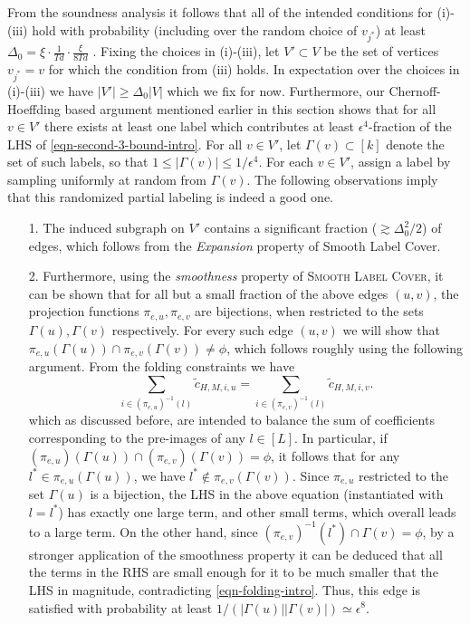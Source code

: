 From the soundness analysis it follows that all of the intended conditions for (i)-(iii) hold with probability (including over the random choice of $v_{j^*}$) at least $\Delta_0 = \xi\cdot\frac{1}{Td}\cdot\frac{\xi}{8Td}$ . Fixing the choices in (i)-(iii), let $V' \subset V$ be the set of vertices $v_{j^*} = v$ for which the condition from (iii) holds. In expectation over the choices in (i)-(iii) we have $|V'| \ge \Delta_0|V|$ which we fix for now. Furthermore, our Chernoff-Hoeffding based argument mentioned earlier in this section shows that for all $v \in V'$ there exists at least one label which contributes at least $\epsilon^4$-fraction of the LHS of \eqref{eqn-second-3-bound-intro}. For all $v \in V'$, let $\Gamma(v) \subset [k]$ denote the set of such labels, so that $1 \leq  |\Gamma(v)| \le 1/\epsilon^4$. For each $v \in V'$,  assign a label by sampling uniformly at random from $\Gamma(v)$. The following observations imply that this randomized partial labeling is indeed a good one. 
\begin{itemize}
	\item[1.] The induced subgraph on $V'$ contains a significant fraction ($\gtrsim \Delta^2_0/2$) of edges, which follows from the \emph{Expansion} property of Smooth Label Cover.
	\item[2.] Furthermore, using the \emph{smoothness} property of \textsc{Smooth Label Cover}, it can be shown that for all but a small fraction of the above edges $(u,v)$, the projection functions $\pi_{e,u}, \pi_{e,v}$ are bijections, when restricted to the sets $\Gamma(u),\Gamma(v)$ respectively. For every such edge $(u,v)$ we will show that $\pi_{e,u}(\Gamma(u)) \cap \pi_{e,v}(\Gamma(v)) \neq \phi$, which follows roughly using the following argument. From the folding constraints we have
	\begin{equation}    
	\sum_{i \in (\pi_{e,u})^{-1}(l)}\tilde{c}_{H,M,i,u} = \sum_{i \in
		(\pi_{e,v})^{-1}(l)}\tilde{c}_{H,M,i,v}.\label{eqn-folding-intro}
	\end{equation}
	\noindent which as discussed before, are intended to balance the sum of coefficients corresponding to the pre-images of any $l \in [L]$. In particular, if $(\pi_{e,u})(\Gamma(u)) \cap (\pi_{e,v})(\Gamma(v)) = \phi$, it follows that for any $l^* \in \pi_{e,u}(\Gamma(u))$, we have $l^* \notin \pi_{e,v}(\Gamma(v))$. Since $\pi_{e,u}$ restricted to the set $\Gamma(u)$ is a bijection, the LHS in the above equation (instantiated with $l = l^*$) has exactly one large term, and other small terms, which overall leads to a large term.  On the other hand, since $(\pi_{e,v})^{-1}({l^*} )\cap \Gamma(v) = \phi$, 	by a stronger application of the smoothness property it can be deduced that all the terms in the RHS are small enough for it to be  much smaller that the LHS in magnitude, contradicting \eqref{eqn-folding-intro}. Thus, this edge is satisfied with probability at least $1/(|\Gamma(u)||\Gamma(v)|) \simeq \epsilon^8$.
\end{itemize}
